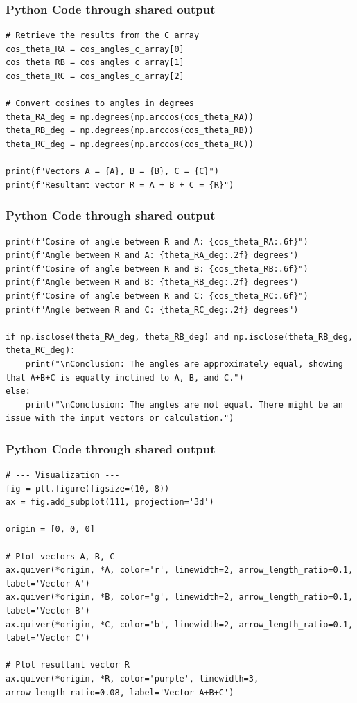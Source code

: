 \documentclass{beamer}
\begin{document}
\begin{frame}[fragile]
\frametitle{Python Code through shared output}
\begin{lstlisting}
# Retrieve the results from the C array
cos_theta_RA = cos_angles_c_array[0]
cos_theta_RB = cos_angles_c_array[1]
cos_theta_RC = cos_angles_c_array[2]

# Convert cosines to angles in degrees
theta_RA_deg = np.degrees(np.arccos(cos_theta_RA))
theta_RB_deg = np.degrees(np.arccos(cos_theta_RB))
theta_RC_deg = np.degrees(np.arccos(cos_theta_RC))

print(f"Vectors A = {A}, B = {B}, C = {C}")
print(f"Resultant vector R = A + B + C = {R}")
\end{lstlisting}
\end{frame}

\begin{frame}[fragile]
\frametitle{Python Code through shared output}
\begin{lstlisting}
print(f"Cosine of angle between R and A: {cos_theta_RA:.6f}")
print(f"Angle between R and A: {theta_RA_deg:.2f} degrees")
print(f"Cosine of angle between R and B: {cos_theta_RB:.6f}")
print(f"Angle between R and B: {theta_RB_deg:.2f} degrees")
print(f"Cosine of angle between R and C: {cos_theta_RC:.6f}")
print(f"Angle between R and C: {theta_RC_deg:.2f} degrees")

if np.isclose(theta_RA_deg, theta_RB_deg) and np.isclose(theta_RB_deg, theta_RC_deg):
    print("\nConclusion: The angles are approximately equal, showing that A+B+C is equally inclined to A, B, and C.")
else:
    print("\nConclusion: The angles are not equal. There might be an issue with the input vectors or calculation.")
\end{lstlisting}
\end{frame}

\begin{frame}[fragile]
\frametitle{Python Code through shared output}
\begin{lstlisting}
# --- Visualization ---
fig = plt.figure(figsize=(10, 8))
ax = fig.add_subplot(111, projection='3d')

origin = [0, 0, 0]

# Plot vectors A, B, C
ax.quiver(*origin, *A, color='r', linewidth=2, arrow_length_ratio=0.1, label='Vector A')
ax.quiver(*origin, *B, color='g', linewidth=2, arrow_length_ratio=0.1, label='Vector B')
ax.quiver(*origin, *C, color='b', linewidth=2, arrow_length_ratio=0.1, label='Vector C')

# Plot resultant vector R
ax.quiver(*origin, *R, color='purple', linewidth=3, arrow_length_ratio=0.08, label='Vector A+B+C')
\end{lstlisting}
\end{frame}
\end{document}
